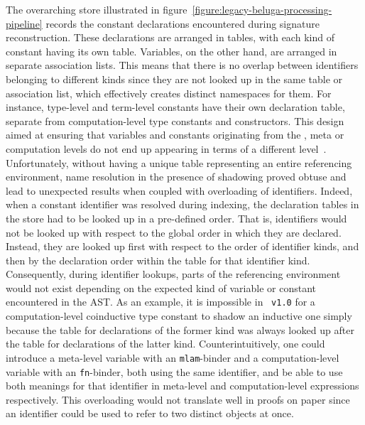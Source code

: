 The overarching store illustrated in figure~\ref{figure:legacy-beluga-processing-pipeline} records the constant declarations encountered during signature reconstruction.
These declarations are arranged in tables, with each kind of constant having its own table.
Variables, on the other hand, are arranged in separate association lists.
This means that there is no overlap between identifiers belonging to different kinds since they are not looked up in the same table or association list, which effectively creates distinct namespaces for them.
For instance, \LF type-level and term-level constants have their own declaration table, separate from computation-level type constants and constructors.
This design aimed at ensuring that variables and constants originating from the \LF, meta or computation levels do not end up appearing in terms of a different level~\cite{germain2010implementation}.
Unfortunately, without having a unique table representing an entire referencing environment, name resolution in the presence of shadowing proved obtuse and lead to unexpected results when coupled with overloading of identifiers.
Indeed, when a constant identifier was resolved during indexing, the declaration tables in the store had to be looked up in a pre-defined order.
That is, identifiers would not be looked up with respect to the global order in which they are declared.
Instead, they are looked up first with respect to the order of identifier kinds, and then by the declaration order within the table for that identifier kind.
Consequently, during identifier lookups, parts of the referencing environment would not exist depending on the expected kind of variable or constant encountered in the \ac{AST}.
As an example, it is impossible in \Beluga~\texttt{v1.0} for a computation-level coinductive type constant to shadow an inductive one simply because the table for declarations of the former kind was always looked up after the table for declarations of the latter kind.
Counterintuitively, one could introduce a meta-level variable with an \verb|mlam|-binder and a computation-level variable with an \verb|fn|-binder, both using the same identifier, and be able to use both meanings for that identifier in meta-level and computation-level expressions respectively.
This overloading would not translate well in proofs on paper since an identifier could be used to refer to two distinct objects at once.


